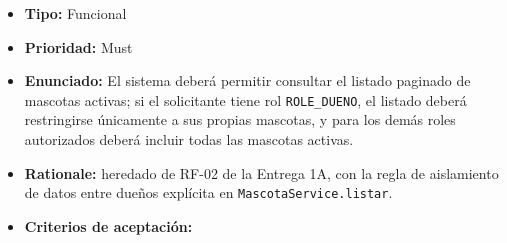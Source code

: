 \documentclass[
  spanish,
]{article}
\providecommand{\tightlist}{%
  \setlength{\itemsep}{0pt}\setlength{\parskip}{0pt}}
\begin{document}
\begin{itemize}
\tightlist
\item
  \textbf{Tipo:} Funcional
\item
  \textbf{Prioridad:} Must
\item
  \textbf{Enunciado:} El sistema deberá permitir consultar el listado
  paginado de mascotas activas; si el solicitante tiene rol
  \texttt{ROLE\_\allowbreak{}DUENO}, el listado deberá restringirse únicamente a sus
  propias mascotas, y para los demás roles autorizados deberá incluir
  todas las mascotas activas.
\item
  \textbf{Rationale:} heredado de RF-02 de la Entrega 1A, con la regla
  de aislamiento de datos entre dueños explícita en
  \texttt{Mascota\allowbreak{}Service.\allowbreak{}listar}.
\item
  \textbf{Criterios de aceptación:}


\end{itemize}
\end{document}
